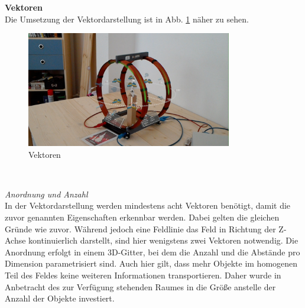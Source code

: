 \textbf{Vektoren}\\
Die Umsetzung der Vektordarstellung ist in Abb. \ref{img:mfield-vectors} näher zu sehen.
\begin{figure}[H]
	\centering
	\includegraphics[width=0.8\textwidth]{images/HL/vectors.jpg}
	\caption{Vektoren}
	\label{img:mfield-vectors}
\end{figure}
\vspace{4px}
\begin{center}
	\\
\end{center}
\vspace{6px}

\textit{Anordnung und Anzahl}\\
In der Vektordarstellung werden mindestens acht Vektoren benötigt, damit die zuvor genannten Eigenschaften erkennbar werden. Dabei gelten die gleichen Gründe wie zuvor. Während jedoch eine Feldlinie das Feld in Richtung der Z-Achse kontinuierlich darstellt, sind hier wenigstens zwei Vektoren notwendig. Die Anordnung erfolgt in einem 3D-Gitter, bei dem die Anzahl und die Abstände pro Dimension parametrisiert sind. Auch hier gilt, dass mehr Objekte im homogenen Teil des Feldes keine weiteren Informationen transportieren. Daher wurde in Anbetracht des zur Verfügung stehenden Raumes in die Größe anstelle der Anzahl der Objekte investiert.\\

